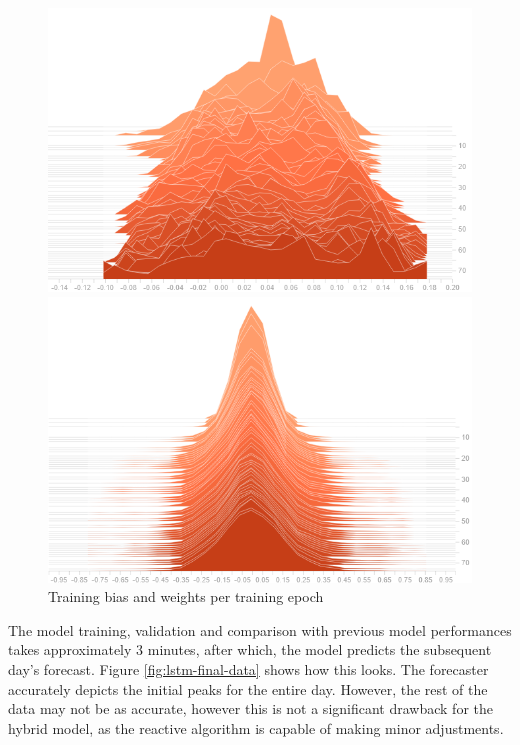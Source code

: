 \begin{figure}[htb]
    \centering
    \caption{Training bias and weights per training epoch}
    \label{fig:bias-weight-training}
    \begin{minipage}{0.45\linewidth}
        \includegraphics[width=1.0\linewidth]{Figures/LSTM-Bias.png}
    \end{minipage}\hfill
    \begin{minipage}{0.45\linewidth}
        \includegraphics[width=1.0\linewidth]{Figures/LSTM-Weights.png}
    \end{minipage}
\end{figure}

The model training, validation and comparison with previous model performances takes approximately 3 minutes, after which, the model predicts the subsequent day's forecast. Figure \ref{fig:lstm-final-data} shows how this looks. The forecaster accurately depicts the initial peaks for the entire day. However, the rest of the data may not be as accurate, however this is not a significant drawback for the hybrid model, as the reactive algorithm is capable of making minor adjustments.

